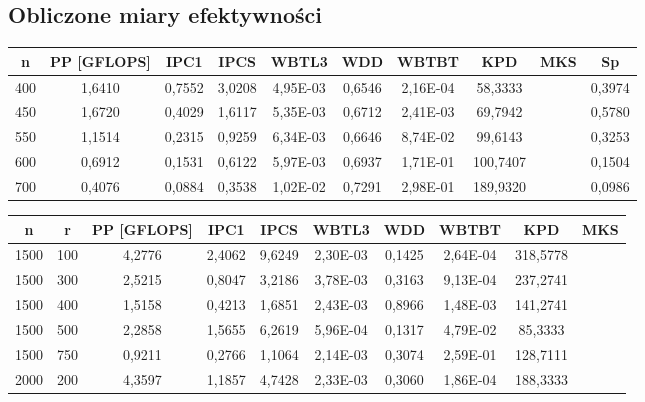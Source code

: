 \documentclass[10pt,a4paper]{article}
\begin{document}
\subsection{Obliczone miary efektywności}
\begin{center}
    \begin{tabular}{ |c|c|c|c|c|c|c|c|c|c| }
        \hline
        n & PP [GFLOPS] & IPC1 & IPCS & WBTL3 & WDD & WBTBT & KPD & MKS & Sp \\
        \hline
        400&1,6410&0,7552&3,0208&4,95E-03&0,6546&2,16E-04&58,3333& &0,3974\\
        \hline
        450&1,6720&0,4029&1,6117&5,35E-03&0,6712&2,41E-03&69,7942& &0,5780\\
        \hline
        550&1,1514&0,2315&0,9259&6,34E-03&0,6646&8,74E-02&99,6143& &0,3253\\
        \hline
        600&0,6912&0,1531&0,6122&5,97E-03&0,6937&1,71E-01&100,7407& &0,1504\\
        \hline
        700&0,4076&0,0884&0,3538&1,02E-02&0,7291&2,98E-01&189,9320& &0,0986\\
        \hline
    \end{tabular}
\end{center}

\begin{center}
    \begin{tabular}{ |c|c|c|c|c|c|c|c|c|c| }
        \hline
        n & r & PP [GFLOPS] & IPC1 & IPCS & WBTL3 & WDD & WBTBT & KPD & MKS \\
        \hline
        1500&100&4,2776&2,4062&9,6249&2,30E-03&0,1425&2,64E-04&318,5778& \\
        \hline
        1500&300&2,5215&0,8047&3,2186&3,78E-03&0,3163&9,13E-04&237,2741& \\
        \hline
        1500&400&1,5158&0,4213&1,6851&2,43E-03&0,8966&1,48E-03&141,2741& \\
        \hline
        1500&500&2,2858&1,5655&6,2619&5,96E-04&0,1317&4,79E-02&85,3333& \\
        \hline
        1500&750&0,9211&0,2766&1,1064&2,14E-03&0,3074&2,59E-01&128,7111& \\
        \hline
        2000&200&4,3597&1,1857&4,7428&2,33E-03&0,3060&1,86E-04&188,3333& \\
        \hline
    \end{tabular}
\end{center}
\end{document}
